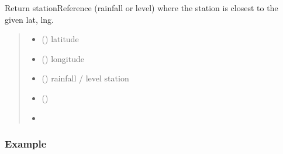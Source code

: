 \documentclass[letterpaper,10pt,english]{sphinxmanual}
\begin{document}
\begin{fulllineitems}
\label{\detokenize{index:flood_tool.get_closest_station_ref_by_type_from_lat_lng}}
\pysigstartsignatures
{}
\pysigstopsignatures
\sphinxAtStartPar
Return stationReference (rainfall or level) where the station is
closest to the given lat, lng.
\begin{quote}\begin{description}
\begin{itemize}
\item {} 
\sphinxAtStartPar
{} () \textendash{} latitude

\item {} 
\sphinxAtStartPar
{} () \textendash{} longitude

\item {} 
\sphinxAtStartPar
{} () \textendash{} rainfall / level station

\end{itemize}

\sphinxAtStartPar
\begin{itemize}
\item {} 
\sphinxAtStartPar
{} ()

\item {} 
\sphinxAtStartPar
{}

\end{itemize}


\end{description}\end{quote}
\subsubsection*{Example}

\begin{sphinxVerbatim}[commandchars=\\\{\}]
   
\end{sphinxVerbatim}

\end{fulllineitems}
\end{document}
